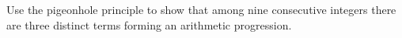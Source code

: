 Use the pigeonhole principle to show that among nine consecutive integers there are three distinct terms forming an arithmetic progression.
